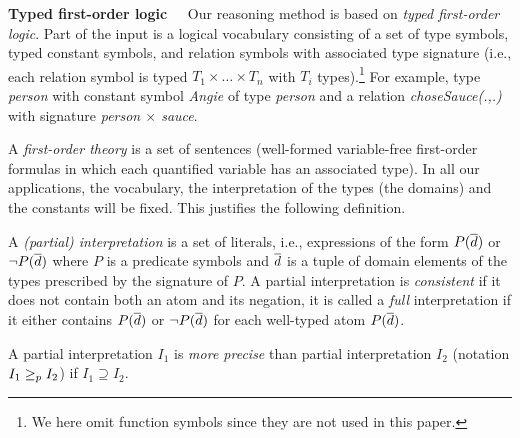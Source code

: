 \noindent\textbf{Typed first-order logic\ \ }
Our reasoning method is based on \emph{typed first-order logic}. %
Part of the input is a logical vocabulary consisting of a set of type symbols, typed constant symbols, and relation symbols with associated type signature (i.e., each relation symbol is typed $T_1\times \dots \times T_n$ with $T_i$ types).\footnote{We here omit function symbols since they are not used in this paper.} For example, type \textit{person} with constant symbol \textit{Angie} of type \textit{person} and a relation \textit{choseSauce(.,.)} with signature \textit{person $\times$ sauce}.


A \emph{first-order theory} is a set of sentences (well-formed variable-free first-order formulas in which each quantified variable has an associated type).
In all our applications, the vocabulary, the interpretation of the types (the domains) and the constants will be fixed. 
This justifies the following definition. 
\begin{definition}
 A \emph{(partial) interpretation} is a set of literals, i.e., expressions of the form $P(\overline{d})$ or $\lnot P(\overline{d})$ where $P$ is a predicate symbols and $\overline{d}$ is a tuple of domain elements of the types prescribed by the signature of $P$. A partial interpretation is \emph{consistent} if it does not contain both an atom and its negation, it is called a \emph{full} interpretation if it either contains $P(\overline{d})$ or $\lnot P(\overline{d})$ for each well-typed atom $P(\overline{d})$. 
\end{definition}
% 
A partial interpretation $I_1$ is \emph{more precise} than partial interpretation $I_2$ (notation $I_1\geq_p I_2$) if $I_1\supseteq I_2$.

% 
% 
